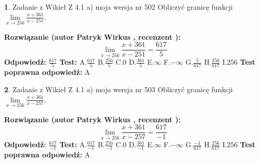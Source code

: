 \documentclass[12pt, a4paper]{article}
\theoremstyle{definition} %
\newtheorem{zad}{}
\newcommand{\zadStart}[1]{\begin{zad}#1\newline}
\newcommand{\zadStop}{\end{zad}}
\newcommand{\rozwStart}[2]{\noindent \textbf{Rozwiązanie (autor #1 , recenzent #2): }\newline}
\newcommand{\rozwStop}{\newline}
\newcommand{\odpStart}{\noindent \textbf{Odpowiedź:}\newline}
\newcommand{\odpStop}{\newline}
\newcommand{\testStart}{\noindent \textbf{Test:}\newline}
\newcommand{\testStop}{\newline}
\newcommand{\kluczStart}{\noindent \textbf{Test poprawna odpowiedź:}\newline}
\newcommand{\kluczStop}{\newline}
\begin{document}
\zadStart{Zadanie z Wikieł Z 4.1 a) moja wersja nr 502}
Obliczyć granicę funkcji $\lim\limits_{x\to256}\frac{x+361}{x-251}$.
\zadStop
\rozwStart{Patryk Wirkus}{}
$$\lim\limits_{x\to256}\frac{x+361}{x-251} = \frac{617}{5}$$
\rozwStop
\odpStart
$\frac{617}{5}$
\odpStop
\testStart
A.$\frac{617}{5}$
B.$\frac{256}{5}$
C.$0$
D.$\frac{361}{5}$
E.$\infty$
F.$-\infty$
G.$\frac{5}{617}$
H.$\frac{256}{617}$
I.$256$
\testStop
\kluczStart
A
\kluczStop



\zadStart{Zadanie z Wikieł Z 4.1 a) moja wersja nr 503}
Obliczyć granicę funkcji $\lim\limits_{x\to256}\frac{x+361}{x-257}$.
\zadStop
\rozwStart{Patryk Wirkus}{}
$$\lim\limits_{x\to256}\frac{x+361}{x-257} = \frac{617}{-1}$$
\rozwStop
\odpStart
$\frac{617}{-1}$
\odpStop
\testStart
A.$\frac{617}{-1}$
B.$\frac{256}{-1}$
C.$0$
D.$\frac{361}{-1}$
E.$\infty$
F.$-\infty$
G.$\frac{-1}{617}$
H.$\frac{256}{617}$
I.$256$
\testStop
\kluczStart
A
\kluczStop
\end{document}
